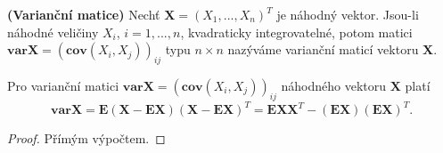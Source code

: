 \begin{definition}{\textbf{(Varianční matice)}}
Nechť $\textbf{X} = (X_{1}, ..., X_{n})^{T}$ je náhodný vektor. Jsou-li náhodné veličiny $X_{i}$, $i = 1, ..., n$, kvadraticky integrovatelné, potom matici $\mathbf{var}\textbf{X} = (\mathbf{cov}(X_{i}, X_{j}))_{ij}$ typu $n \times n$ nazýváme varianční maticí vektoru $\textbf{X}$.
\end{definition}

\begin{proposition}\label{Tvrzeni01}
Pro varianční matici $\mathbf{var}\textbf{X} = (\mathbf{cov}(X_{i}, X_{j}))_{ij}$ náhodného vektoru $\textbf{X}$ platí
\begin{equation}
\mathbf{var}\textbf{X} = \mathbf{E}(\textbf{X} - \mathbf{E}\textbf{X})(\textbf{X} - \mathbf{E}\textbf{X})^{T} = \mathbf{E}\textbf{X}\textbf{X}^{T} - (\mathbf{E}\textbf{X})(\mathbf{E}\textbf{X})^{T}.
\end{equation}
\end{proposition}
\begin{proof}
Přímým výpočtem.
\end{proof}

